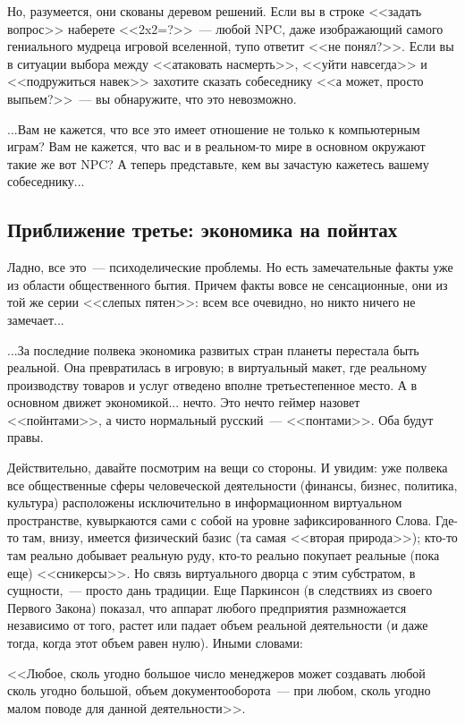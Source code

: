 \documentclass{scrbook}
\newcommand{\flqq}{<<}
\newcommand{\frqq}{>>}
\newcommand{\mdash}{~--- }
\newcommand{\commamdash}{~--- } %
\newcommand{\essaysection}[1]{\subsection*{#1}\nopagebreak}
\begin{document}
Но, разумеется, они скованы деревом решений. Если вы в строке {\flqq}задать вопрос{\frqq} наберете {\flqq}2x2=?{\frqq}{\mdash}любой NPC, даже изображающий самого гениального мудреца игровой вселенной, тупо ответит {\flqq}не понял?{\frqq}. Если вы в ситуации выбора между {\flqq}атаковать насмерть{\frqq}, {\flqq}уйти навсегда{\frqq} и {\flqq}подружиться навек{\frqq} захотите сказать собеседнику {\flqq}а может, просто выпьем?{\frqq}{\mdash}вы обнаружите, что это невозможно.

...Вам не кажется, что все это имеет отношение не только к компьютерным играм? Вам не кажется, что вас и в реальном-то мире в основном окружают такие же вот NPC? А теперь представьте, кем вы зачастую кажетесь вашему собеседнику...

\essaysection{Приближение третье: экономика на пойнтах}

Ладно, все это{\mdash}психоделические проблемы. Но есть замечательные факты уже из области общественного бытия. Причем факты вовсе не сенсационные, они из той же серии {\flqq}слепых пятен{\frqq}: всем все очевидно, но никто ничего не замечает...

...За последние полвека экономика развитых стран планеты перестала быть реальной. Она превратилась в игровую; в виртуальный макет, где реальному производству товаров и услуг отведено вполне третьестепенное место. А в основном движет экономикой... нечто. Это нечто геймер назовет {\flqq}пойнтами{\frqq}, а чисто нормальный русский{\mdash}{\flqq}понтами{\frqq}. Оба будут правы.

Действительно, давайте посмотрим на вещи со стороны. И увидим: уже полвека все общественные сферы человеческой деятельности (финансы, бизнес, политика, культура) расположены исключительно в информационном виртуальном пространстве, кувыркаются сами с собой на уровне зафиксированного Слова. Где-то там, внизу, имеется физический базис (та самая {\flqq}вторая природа{\frqq}); кто-то там реально добывает реальную руду, кто-то реально покупает реальные (пока еще) {\flqq}сникерсы{\frqq}. Но связь виртуального дворца с этим субстратом, в сущности,{\commamdash}просто дань традиции. Еще Паркинсон (в следствиях из своего Первого Закона) показал, что аппарат любого предприятия размножается независимо от того, растет или падает объем реальной деятельности (и даже тогда, когда этот объем равен нулю). Иными словами:

{\flqq}Любое, сколь угодно большое число менеджеров может создавать любой сколь угодно большой, объем документооборота{\mdash}при любом, сколь угодно малом поводе для данной деятельности{\frqq}.
\end{document}

